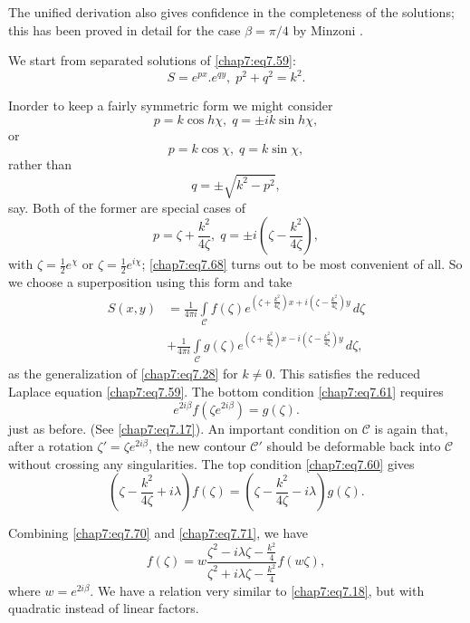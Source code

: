 {{The unified derivation also gives confidence in the completeness of the solutions; this has been proved in detail for the case $\beta=\pi/4$ by Minzoni \cite{key15}.

We start from separated solutions of \eqref{chap7:eq7.59}:
$$
S=e^{px}.e^{qy},\;p^2+q^2=k^2.
$$

In\pageoriginale order to keep a fairly symmetric form we might consider 
$$
p=k\cos h\chi,\;q=\pm ik\sin h \chi,
$$
or
$$
p=k\cos\chi,\;q=k\sin\chi,
$$
rather than
$$
q=\pm\sqrt{k^2-p^2},
$$
say. Both of the former are special cases of 
\begin{equation}
p=\zeta+\frac{k^2}{4\zeta},\;q=\pm i\left(\zeta-\frac{k^2}{4\zeta}\right), \tag{7.68}\label{chap7:eq7.68}
\end{equation}
with $\zeta=\frac{1}{2}e^\chi$ or $\zeta=\frac{1}{2}e^{i\chi}$; \eqref{chap7:eq7.68} turns out to be most convenient of all. So we choose a superposition using this form and take 
\begin{align*}
S(x,y) &= \frac{1}{4\pi i}\int\limits_{\mathscr{C}}f(\zeta) e^{\left(\zeta+\frac{k^2}{4\zeta}\right)x+i\left(\zeta-\frac{k^2}{4\zeta} \right)y}\,d\zeta\\
&+\frac{1}{4\pi i}\int\limits_{\mathscr{C}}g(\zeta) e^{\left(\zeta+\frac{k^2}{4\zeta}\right)x-i\left(\zeta-\frac{k^2}{4\zeta} \right)y}\,d\zeta, \tag{7.69}\label{chap7:eq7.69}
\end{align*}
as the generalization of \eqref{chap7:eq7.28} for $k\neq 0$. This satisfies the reduced Laplace equation \eqref{chap7:eq7.59}. The bottom condition \eqref{chap7:eq7.61} requires 
\begin{equation}
e^{2i\beta}f\left(\zeta e^{2i\beta}\right)=g(\zeta).\tag{7.70}\label{chap7:eq7.70}
\end{equation}
just as before. (See \eqref{chap7:eq7.17}). An important condition on $\mathscr{C}$ is again that, after a rotation $\zeta'=\zeta e^{2i\beta}$, the new contour $\mathscr{C'}$ should be deformable back into $\mathscr{C}$ without crossing any singularities. The top condition \eqref{chap7:eq7.60} gives
\begin{equation}
\left(\zeta-\frac{k^2}{4\zeta}+i\lambda\right)f(\zeta)=\left(\zeta-\frac{k^2} {4\zeta}-i\lambda\right)g(\zeta).\tag{7.71}\label{chap7:eq7.71}
\end{equation}

Combining \eqref{chap7:eq7.70} and \eqref{chap7:eq7.71}, we have 
\begin{equation}
f(\zeta)=w\frac{\zeta^2-i\lambda\zeta-\frac{k^2}{4}} {\zeta^2+i\lambda\zeta- \frac{k^2}{4}}f(w\zeta),\tag{7.72}\label{chap7:eq7.72}
\end{equation}\pageoriginale
where $w=e^{2i\beta}$. We have a relation very similar to \eqref{chap7:eq7.18}, but with quadratic instead of linear factors.

}}
